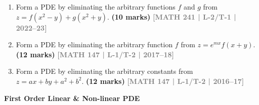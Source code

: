 \documentclass[12pt,a4paper]{article}
\newcommand{\yr}[1]{\hfill\textcolor{gray}{\small\textbf{[#1]}}}
\newcommand{\mk}[1]{\textcolor{orange!70!black}{\small\textbf{(#1 marks)}}}
\newcommand{\subtopic}[2]{%
  \vspace{10pt}
  \noindent\begin{tcolorbox}[colback=#1!8,colframe=#1,boxrule=0.6pt,arc=4pt,
    left=6pt,right=6pt,top=4pt,bottom=4pt]
    \small\bfseries\textcolor{#1}{#2}
  \end{tcolorbox}
  \vspace{2pt}
}
\begin{document}
\begin{enumerate}\item Form a PDE by eliminating the arbitrary functions $f$ and $g$ from $z=f(x^{2}-y)+g(x^{2}+y)$.
\mk{10} \yr{MATH 241 | L-2/T-1 | 2022--23}

\item Form a PDE by eliminating the arbitrary function $f$ from $z=e^{mx}f(x+y)$.
\mk{12} \yr{MATH 147 | L-1/T-2 | 2017--18}

\item Form a PDE by eliminating the arbitrary constants from $z=ax+by+a^{2}+b^{2}$.
\mk{12} \yr{MATH 147 | L-1/T-2 | 2016--17}

\end{enumerate}

\subtopic{cF}{First Order Linear \& Non-linear PDE}
\label{sub:s6-first}
\end{document}
